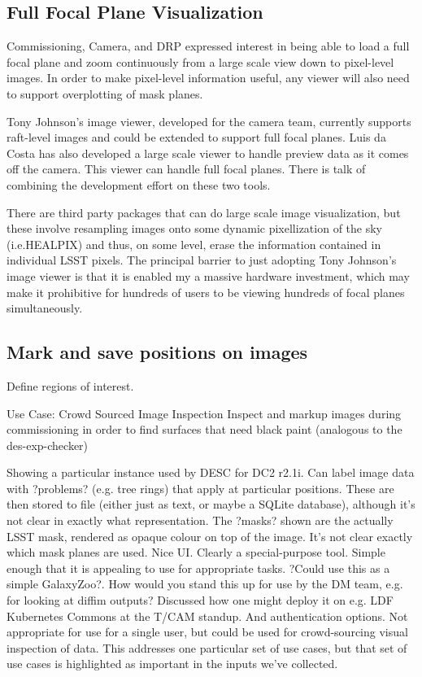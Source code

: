 \subsection{Full Focal Plane Visualization}
\label{sec:large_viz}
Commissioning, Camera, and DRP expressed interest in being able to load a full focal plane and zoom continuously
from a large scale view down to pixel-level images.  In order to make pixel-level information useful, any
viewer will also need to support overplotting of mask planes.

Tony Johnson's image viewer, developed for the camera team, currently supports raft-level images and could be
extended to support full focal planes.  Luis da Costa has also developed a large scale viewer to handle preview
data as it comes off the camera.  This viewer can handle full focal planes.  There is talk of combining the
development effort on these two tools.

There are third party packages that can do large scale image
visualization, but these involve resampling images onto some dynamic pixellization of the sky (i.e.HEALPIX) and
thus, on some level, erase the information contained in individual LSST pixels.  The principal barrier to just
adopting Tony Johnson's image viewer is that it is enabled my a massive hardware investment, which may make it
prohibitive for hundreds of users to be viewing hundreds of focal planes simultaneously.

\subsection{Mark and save positions on images}


Define regions of interest.

Use Case: Crowd Sourced Image Inspection
Inspect and markup images during commissioning in order to find surfaces that need black paint (analogous to the des-exp-checker)


Showing a particular instance used by DESC for DC2 r2.1i.
Can label image data with ?problems? (e.g. tree rings) that apply at particular positions.
These are then stored to file (either just as text, or maybe a SQLite database), although it's not clear in exactly what representation.
The ?masks? shown are the actually LSST mask, rendered as opaque colour on top of the image.
It's not clear exactly which mask planes are used.
Nice UI.
Clearly a special-purpose tool.
Simple enough that it is appealing to use for appropriate tasks.
?Could use this as a simple GalaxyZoo?.
How would you stand this up for use by the DM team, e.g. for looking at diffim outputs?
Discussed how one might deploy it on e.g. LDF Kubernetes Commons at the T/CAM standup.
And authentication options.
Not appropriate for use for a single user, but could be used for crowd-sourcing visual inspection of data.
This addresses one particular set of use cases, but that set of use cases is highlighted as important in the inputs we've collected.

